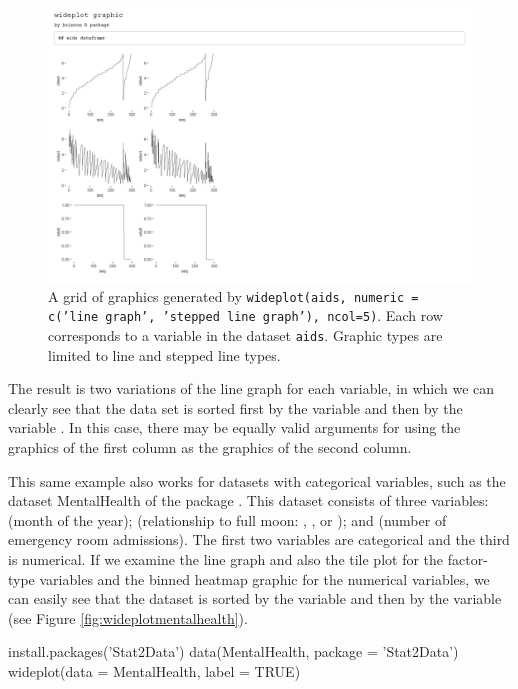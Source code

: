 \begin{Schunk}
	\begin{figure}[H]
\includegraphics[width=0.9\linewidth]{figures/wideplot_aids} \caption[Output of 'wideplot(aids, numeric = c('line graph', 'stepped line graph'), ncol=5)']{A grid of graphics generated by \texttt{wideplot(aids, numeric = c('line graph', 'stepped line graph'), ncol=5)}. Each row corresponds to a variable in the dataset \texttt{aids}. Graphic types are limited to line and stepped line types.}\label{fig:wideplotaids2}
	\end{figure}
\end{Schunk}

The result is two variations of the line graph for each variable, in
which we can clearly see that the data set is sorted first by the
variable  and then by the variable . In this
case, there may be equally valid arguments for using the graphics of the
first column as the graphics of the second column.

This same example also works for datasets with categorical variables,
such as the dataset MentalHealth of the package . This
dataset consists of three variables:  (month of the year);
 (relationship to full moon: , , or
); and  (number of emergency room
admissions). The first two variables are categorical and the third is
numerical. If we examine the line graph and also the tile plot for the
factor-type variables and the binned heatmap graphic for the numerical
variables, we can easily see that the dataset is sorted by the variable
 and then by the variable  (see Figure
\ref{fig:wideplotmentalhealth}).

\begin{example}
  install.packages('Stat2Data')
  data(MentalHealth, package = 'Stat2Data')
  wideplot(data = MentalHealth, label = TRUE)
\end{example}

